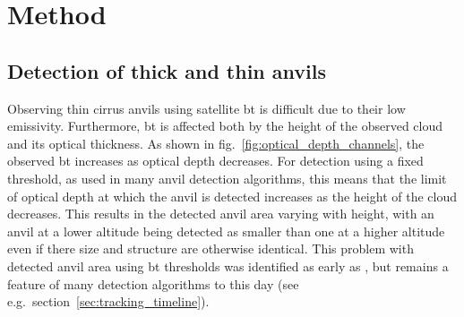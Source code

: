\section{Method}

\subsection{Detection of thick and thin anvils}

Observing thin cirrus anvils using satellite \acrshort{bt} is difficult due to their low emissivity.
Furthermore, \acrshort{bt} is affected both by the height of the observed cloud and its optical thickness.
As shown in fig.~\ref{fig:optical_depth_channels}, the observed \acrshort{bt} increases as optical depth decreases.
For detection using a fixed threshold, as used in many anvil detection algorithms, this means that the limit of optical depth at which the anvil is detected increases as the height of the cloud decreases.
This results in the detected anvil area varying with height, with an anvil at a lower altitude being detected as smaller than one at a higher altitude even if there size and structure are otherwise identical.
This problem with detected anvil area using \acrshort{bt} thresholds was identified as early as \citet{augustine_mesoscale_1988}, but remains a feature of many detection algorithms to this day (see e.g.\ section~\ref{sec:tracking_timeline}).

